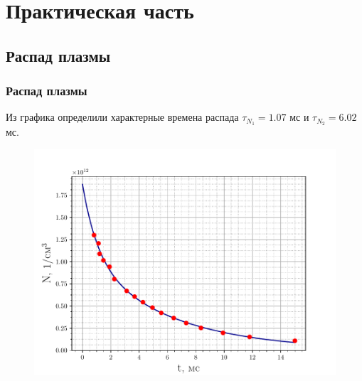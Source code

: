 \documentclass[10pt,pdf,hyperref={unicode}, dvipsnames]{beamer}
\begin{document}
\section{Практическая часть} %
\subsection{Распад  плазмы}
\begin{frame}
	\frametitle{Распад плазмы}
	Из графика определили характерные времена распада $\tau_{N_1}=1.07$ мс
	и $\tau_{N_2}=6.02$ мс.

	\begin{figure}[tb]
		\centering
		\includegraphics[width=0.9\linewidth]{fig/decay}
		\label{fig:2}
	\end{figure}
\end{frame}
\end{document}

